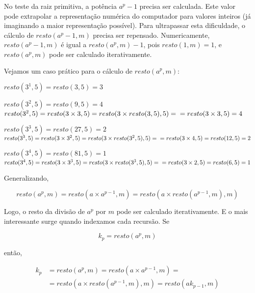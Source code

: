 \documentclass[a4paper,12pt,oneside,onecolumn]{uerj}
\begin{document}
No teste da raiz primitiva, a potência $a^p-1$ precisa ser calculada. Este valor pode extrapolar a representação numérica do computador para valores inteiros (já imaginando a maior representação possível). Para ultrapassar esta dificuldade, o cálculo de $resto(a^{p}-1,m)$ precisa ser repensado. Numericamente, $resto(a^{p}-1,m)$ é igual a $resto(a^{p},m)-1$, pois $resto(1,m)=1$, e $resto(a^{p},m)$ pode ser calculado iterativamente. 

Vejamos um caso prático para o cálculo de $resto(a^{p},m)$:

\begin{lcircp}
    \item $resto(3^{1},5)=resto(3,5)=3$
    \item $resto(3^{2},5)=resto(9,5)=4$\\
          $resto(3^{2},5)=resto(3\times 3,5)=resto(3\times resto(3,5),5)=\\
          =resto(3\times 3,5)=4$
    \item $resto(3^{3},5)=resto(27,5)=2$\\
          $resto(3^{3},5)=resto(3\times 3^2,5)=resto(3\times resto(3^2,5),5)=\\
          =resto(3\times 4,5)=resto(12,5)=2$
    \item $resto(3^{4},5)=resto(81,5)=1$\\
          $resto(3^{4},5)=resto(3\times 3^3,5)=resto(3\times resto(3^3,5),5)=\\
          =resto(3\times 2,5)=resto(6,5)=1$\\
\end{lcircp}

\noindent Generalizando,

\begin{equation}
resto(a^{p},m)=resto(a\times a^{p-1},m)=resto(a\times resto(a^{p-1},m),m)
\end{equation}

\noindent Logo, o resto da divisão de $a^{p}$ por $m$ pode ser calculado iterativamente. E o mais interessante surge quando indexamos cada recursão. Se

\begin{equation}
k_p = resto(a^{p},m)
\end{equation}

\noindent então,

\begin{equation}
  \begin{array}{rl}
  k_{p}&=resto(a^{p},m)=resto(a\times a^{p-1},m)=\\
       &=resto(a\times resto(a^{p-1},m),m)=resto(ak_{p-1},m)
  \end{array}
\end{equation}
\end{document}
